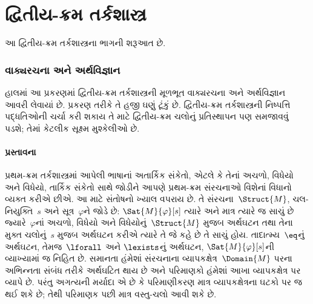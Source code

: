 
\part{દ્વિતીય-ક્રમ તર્કશાસ્ત્ર}

\begin{editorial}
આ દ્વિતીય-ક્રમ તર્કશાસ્ત્રના ભાગની શરૂઆત છે.
\end{editorial}













\section{વાક્યરચના અને અર્થવિજ્ઞાન}

\begin{editorial}
હાલમાં આ પ્રકરણમાં દ્વિતીય-ક્રમ તર્કશાસ્ત્રની મૂળભૂત વાક્યરચના અને
અર્થવિજ્ઞાન આવરી લેવાયાં છે. પ્રકરણ તરીકે તે હજી ઘણું ટૂંકું છે.
દ્વિતીય-ક્રમ તર્કશાસ્ત્રની નિષ્પત્તિ પદ્ધતિઓની ચર્ચા કરી શકાય તે
માટે દ્વિતીય-ક્રમ ચલોનું પ્રતિસ્થાપન પણ સમજાવવું પડશે; તેમાં કેટલીક
સૂક્ષ્મ મુશ્કેલીઓ છે.
\end{editorial}



















\subsection{પ્રસ્તાવના}\label{sol:syn:int:sec}

પ્રથમ-ક્રમ તર્કશાસ્ત્રમાં આપેલી ભાષાનાં અતાર્કિક સંકેતો, એટલે કે તેનાં
અચળો, વિધેયો અને વિધેયો, તાર્કિક સંકેતો સાથે
જોડીને આપણે પ્રથમ-ક્રમ સંરચનાઓ વિશેનાં વિધાનો વ્યક્ત કરીએ છીએ.
આ માટે સંતોષનો ખ્યાલ વપરાય છે. તે સંરચના~$\Struct{M}$,
ચલ-નિયુક્તિ~$s$ અને સૂત્ર~$\varphi$ને જોડે છે: $\Sat{M}{\varphi}[s]$
ત્યારે અને માત્ર ત્યારે જ સાચું છે જ્યારે~$\varphi$નાં અચળો,
વિધેયો અને વિધેયોનું~$\Struct{M}$ મુજબ અર્થઘટન તથા
તેના મુક્ત ચલોનું~$s$ મુજબ અર્થઘટન કરીએ ત્યારે તે જે કહે છે તે
સાચું હોય. તાદાત્મ્ય~$\eq$નું અર્થઘટન, તેમજ~$\lforall$ અને
$\lexists$નું અર્થઘટન, $\Sat{M}{\varphi}[s]$ની વ્યાખ્યામાં જ નિહિત છે.
સમાનતા હંમેશાં સંરચનાના વ્યાપકક્ષેત્ર~$\Domain{M}$ પરના અભિન્નતા
સંબંધ તરીકે અર્થઘટિત થાય છે અને પરિમાણકો હંમેશાં આખા વ્યાપકક્ષેત્ર પર
વ્યાપે છે. પરંતુ અગત્યની મર્યાદા એ છે કે પરિમાણીકરણ માત્ર
વ્યાપકક્ષેત્રના ઘટકો પર જ થઈ શકે છે; તેથી પરિમાણક પછી માત્ર વસ્તુ-ચલો
આવી શકે છે.

